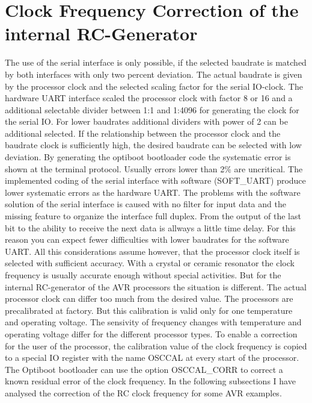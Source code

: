 \section{Clock Frequency Correction of the internal RC-Generator}

The use of the serial interface is only possible, if the selected baudrate is
matched by both interfaces with only two percent deviation.
The actual baudrate is given by the processor clock and the selected scaling factor for
the serial IO-clock. 
The hardware UART interface scaled the processor clock with factor 8 or 16 and a
additional selectable divider between 1:1 and 1:4096 for generating the clock
for the serial IO.
For lower baudrates additional dividers with power of 2 can be additional selected.
If the relationship between the processor clock and the baudrate clock is
sufficiently high, the desired baudrate can be selected with low deviation.
By generating the optiboot bootloader code the systematic error is shown
at the terminal protocol.
Usually errors lower than 2\% are uncritical.
The implemented coding of the serial interface with software (SOFT\_UART) produce
lower systematic errors as the hardware UART.
The problems with the software solution of the serial interface is caused with
no filter for input data and the missing feature to organize the interface
full duplex. From the output of the last bit to the ability to receive
the next data is allways a little time delay.
For this reason you can expect fewer difficulties with lower baudrates for
the software UART.
All this considerations assume however, that the processor clock itself is
selected with sufficient accuracy.
With a crystal or ceramic resonator the clock frequency is usually accurate enough
without special activities. But for the internal RC-generator of the AVR processors
the situation is different.
The actual processor clock can differ too much from the desired value.
The processors are precalibrated at factory. But this calibration is
valid only for one temperature and operating voltage.
The sensivity of frequency changes with temperature and operating voltage
differ for the different processor types.
To enable a correction for the user of the processor, the calibration value
of the clock frequency is copied to a special IO register with the name OSCCAL
at every start of the processor.
The Optiboot bootloader can use the option OSCCAL\_CORR to correct a
known residual error of the clock frequency.
In the following subsections I have analysed the correction of the
RC clock frequency for some AVR examples.


